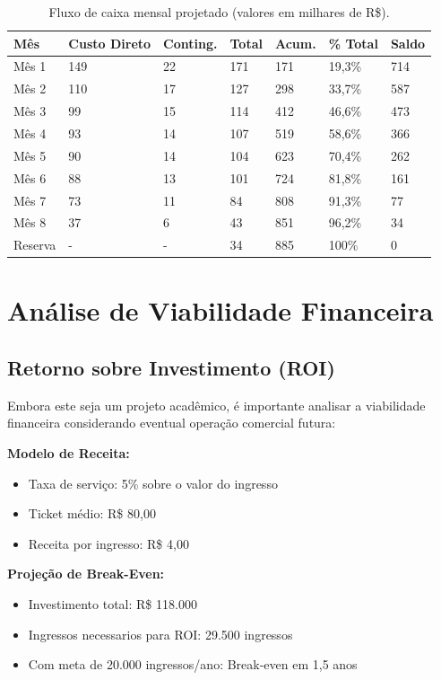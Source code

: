 \begin{table}[H]
\centering
\caption{Fluxo de caixa mensal projetado (valores em milhares de R\$).}%
\label{tab:fluxo-caixa}
\small
\begin{tabular}{|p{3cm}|p{1.5cm}|p{1.7cm}|p{1.5cm}|p{1.5cm}|p{1.5cm}|p{1.5cm}|}
\hline
\textbf{Mês} & \textbf{Custo Direto} & \textbf{Conting.} & \textbf{Total} & \textbf{Acum.} & \textbf{\% Total} & \textbf{Saldo} \\ \hline
Mês 1 & 149 & 22 & 171 & 171 & 19,3\% & 714 \\ \hline
Mês 2 & 110 & 17 & 127 & 298 & 33,7\% & 587 \\ \hline
Mês 3 & 99 & 15 & 114 & 412 & 46,6\% & 473 \\ \hline
Mês 4 & 93 & 14 & 107 & 519 & 58,6\% & 366 \\ \hline
Mês 5 & 90 & 14 & 104 & 623 & 70,4\% & 262 \\ \hline
Mês 6 & 88 & 13 & 101 & 724 & 81,8\% & 161 \\ \hline
Mês 7 & 73 & 11 & 84 & 808 & 91,3\% & 77 \\ \hline
Mês 8 & 37 & 6 & 43 & 851 & 96,2\% & 34 \\ \hline
Reserva & - & - & 34 & 885 & 100\% & 0 \\ \hline
\end{tabular}
\end{table}

\section{Análise de Viabilidade Financeira}

\subsection{Retorno sobre Investimento (ROI)}

Embora este seja um projeto acadêmico, é importante analisar a viabilidade financeira considerando eventual operação comercial futura:

\textbf{Modelo de Receita:}
\begin{itemize}
    \item Taxa de serviço: 5\% sobre o valor do ingresso
    \item Ticket médio: R\$ 80,00
    \item Receita por ingresso: R\$ 4,00
\end{itemize}

\textbf{Projeção de Break-Even:}
\begin{itemize}
    \item Investimento total: R\$ 118.000
    \item Ingressos necessarios para ROI: 29.500 ingressos
    \item Com meta de 20.000 ingressos/ano: Break-even em 1,5 anos
\end{itemize}

